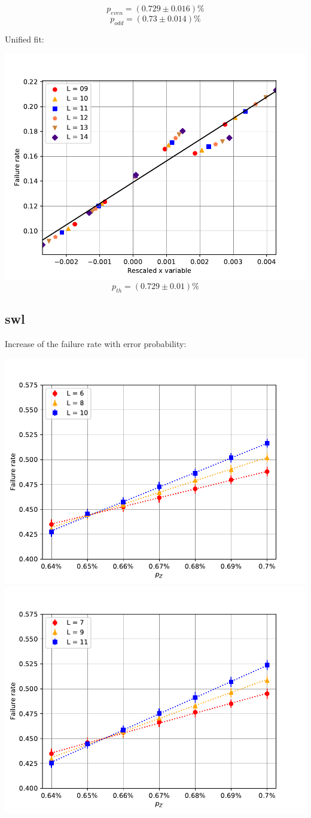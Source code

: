 \documentclass[pra]{revtex4-1}
\begin{document}
\[  p_{even} = (0.729 \pm 0.016)\% \]
\[  p_{odd} = (0.73 \pm 0.014)\% \]
\clearpage 

Unified fit: \begin{center} 

\includegraphics[width=.9\textwidth]{../graphs-paper2/smt-dephasing-rescaled.pdf}
\[  p_{th} = (0.729 \pm 0.01)\% \] \end{center}
\clearpage 

\subsection*{swl}
\noindent Increase of the failure rate with error probability: 
  
\includegraphics[width=.49\textwidth]{../graphs-paper2/swl-dephasing-even.pdf}
\includegraphics[width=.49\textwidth]{../graphs-paper2/swl-dephasing-odd.pdf}
\end{document}

